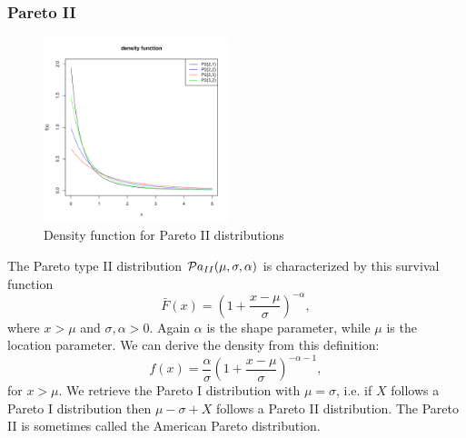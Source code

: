 \subsubsection{Pareto II}
\begin{figure}
  \vspace{-40pt}
  \begin{center}
    \includegraphics[width=0.48\textwidth]{img/pareto2zoom}
  \end{center}
  \vspace{-20pt}  
  \caption{Density function for Pareto II distributions}
  \vspace{-20pt}  
\end{figure}
The Pareto type II distribution $\mathcal Pa_{II}(\mu, \sigma, \alpha)$ is characterized by this survival function
$$
\bar F(x) = \left(1+\frac{x-\mu}{\sigma}\right)^{-\alpha},
$$
where $x>\mu$ and $\sigma,\alpha>0$. Again $\alpha$ is the shape parameter, while $\mu$ is the location parameter. We can derive the density from this definition:
$$
f(x)= \frac{\alpha}{\sigma}  \left(1+\frac{x-\mu}{\sigma}\right)^{-\alpha-1},
$$
for $x>\mu$. We retrieve the Pareto I distribution with $\mu=\sigma$, i.e. if $X$ follows a Pareto I distribution then $\mu-\sigma+X$ follows a Pareto II distribution. The Pareto II is sometimes called the American Pareto distribution.

